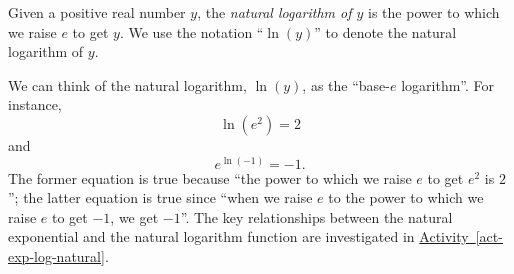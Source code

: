 \documentclass[nooutcomes]{ximera}
\begin{document}
Given a positive real number \(y\), the \emph{natural logarithm of \(y\)} is the power to which we raise \(e\) to get \(y\).  We use the notation ``\(\ln(y)\)'' to denote the natural logarithm of \(y\).%

We can think of the natural logarithm, \(\ln(y)\), as the ``base-\(e\) logarithm''.  For instance,%
\begin{equation*}
\ln(e^2) = 2
\end{equation*}
and%
\begin{equation*}
e^{\ln(-1)} = -1\text{.}
\end{equation*}
The former equation is true because ``the power to which we raise \(e\) to get \(e^2\) is \(2\)''; the latter equation is true since ``when we raise \(e\) to the power to which we raise \(e\) to get \(-1\), we get \(-1\)''.  The key relationships between the natural exponential and the natural logarithm function are investigated in \hyperref[act-exp-log-natural]{Activity~\ref{act-exp-log-natural}}.%
\end{document}
